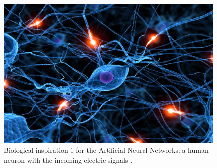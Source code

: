\begin{figure}[!htb]
\centering
\includegraphics[width=.50\columnwidth]{images/048neuron0}
\caption[Biological inspiration 1]{Biological inspiration 1 for the Artificial
Neural Networks: a human neuron with the incoming electric signals
\cite{RefWorks:158}.}
\label{fig:048neuron0}
\end{figure}